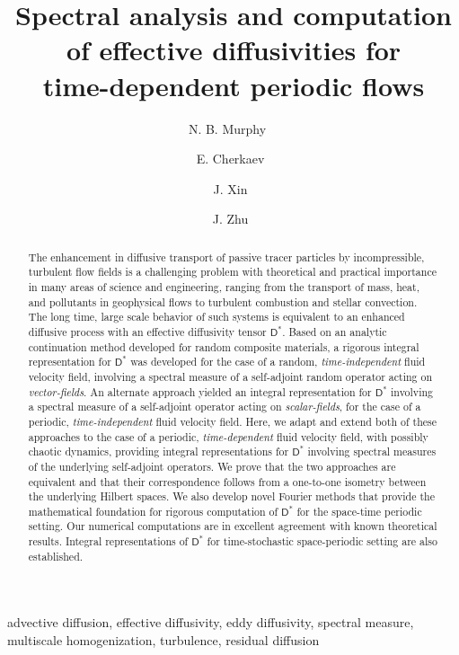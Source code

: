 \documentclass[leqno,onefignum,onetabnum]{siamltex1213}
\title{Spectral analysis and computation \\
  of effective diffusivities for \\
  time-dependent periodic flows  
      }
\author{
N. B. Murphy\footnotemark[1]\ \footnotemark[3]\ \footnotemark[4]
\and E. Cherkaev\footnotemark[2]\ \footnotemark[4]
\and J. Xin\footnotemark[1]\ \footnotemark[3]
\and J. Zhu\footnotemark[2]\ \footnotemark[4]%
}
\newcommand{\Dm}{\mathsf{D}}
\begin{document}
\maketitle
{}%

\begin{abstract}
The enhancement in diffusive transport of passive tracer particles by
incompressible, turbulent flow fields is a challenging problem with
theoretical and practical importance in many areas of science and
engineering, ranging from the transport of mass, heat, and pollutants
in geophysical flows to turbulent combustion and stellar
convection. The long time, large scale behavior of such systems is
equivalent to an enhanced diffusive process with an effective
diffusivity tensor $\Dm^*$. Based on an analytic continuation method
developed for random composite materials, a rigorous integral
representation for $\Dm^*$ was developed for the case of a random,
\emph{time-independent} fluid velocity field, involving a spectral
measure of a self-adjoint random operator acting on
\emph{vector-fields}. An alternate approach yielded an integral
representation for $\Dm^*$ involving a spectral measure of a
self-adjoint operator acting on \emph{scalar-fields}, for the case of
a periodic, \emph{time-independent} fluid velocity field. Here, we
adapt and extend both of these approaches to the case of a periodic,
\emph{time-dependent} fluid velocity field, with possibly chaotic
dynamics, providing integral representations for $\Dm^*$ involving
spectral measures of the underlying self-adjoint operators. We prove
that the two approaches are equivalent and that their correspondence
follows from a one-to-one isometry between the underlying Hilbert
spaces. We also develop novel
Fourier methods that provide the mathematical foundation for rigorous
computation of $\Dm^*$ for the space-time periodic setting. Our
numerical computations are in excellent agreement with known
theoretical results. Integral representations of $\Dm^*$ for
time-stochastic space-periodic setting are also established.
\end{abstract}

\begin{keywords}
advective diffusion, effective diffusivity, eddy diffusivity, spectral
measure, multiscale homogenization, turbulence, residual diffusion
\end{keywords}
\end{document}
